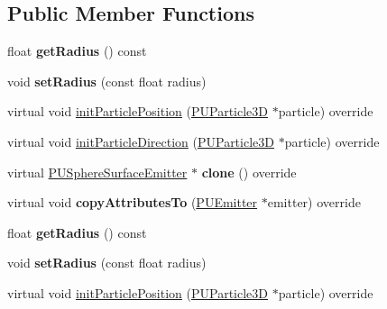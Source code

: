 \subsection*{Public Member Functions}
\begin{DoxyCompactItemize}
\item 
\mbox{\label{classPUSphereSurfaceEmitter_a88aa439bb4cdc890cc7e4b98fdb9c80f}} 
float {\bfseries get\+Radius} () const
\item 
\mbox{\label{classPUSphereSurfaceEmitter_a57ed26c025610de9a9d8c0ae7d7e7777}} 
void {\bfseries set\+Radius} (const float radius)
\item 
virtual void \hyperlink{classPUSphereSurfaceEmitter_aa727aa40576357ab1e2577ae9e47937a}{init\+Particle\+Position} (\hyperlink{structPUParticle3D}{P\+U\+Particle3D} $\ast$particle) override
\item 
virtual void \hyperlink{classPUSphereSurfaceEmitter_aec51594f52f1d4cbeef45f0fc64752db}{init\+Particle\+Direction} (\hyperlink{structPUParticle3D}{P\+U\+Particle3D} $\ast$particle) override
\item 
\mbox{\label{classPUSphereSurfaceEmitter_a605d4e2295d6203a472466b5d92227fe}} 
virtual \hyperlink{classPUSphereSurfaceEmitter}{P\+U\+Sphere\+Surface\+Emitter} $\ast$ {\bfseries clone} () override
\item 
\mbox{\label{classPUSphereSurfaceEmitter_a2adcac5f2fc9671a3479a93c77954635}} 
virtual void {\bfseries copy\+Attributes\+To} (\hyperlink{classPUEmitter}{P\+U\+Emitter} $\ast$emitter) override
\item 
\mbox{\label{classPUSphereSurfaceEmitter_a88aa439bb4cdc890cc7e4b98fdb9c80f}} 
float {\bfseries get\+Radius} () const
\item 
\mbox{\label{classPUSphereSurfaceEmitter_a57ed26c025610de9a9d8c0ae7d7e7777}} 
void {\bfseries set\+Radius} (const float radius)
\item 
virtual void \hyperlink{classPUSphereSurfaceEmitter_a03a5b2d1d21c867c4f22a127555eeb46}{init\+Particle\+Position} (\hyperlink{structPUParticle3D}{P\+U\+Particle3D} $\ast$particle) override
\item 

\end{DoxyCompactItemize}
